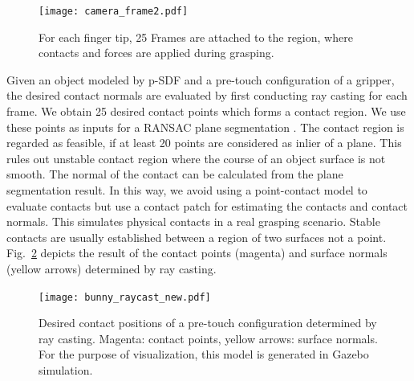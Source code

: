 \begin{figure}
\centering
\texttt{[image: camera\_frame2.pdf]}
\captionsetup{justification=raggedright}
\caption{For each finger tip, 25 Frames are attached to the region, where contacts and forces are applied during grasping.}
\label{fig:simulated_sensor}       %
\end{figure}   

Given an object modeled by p-SDF and a pre-touch configuration of a gripper, the desired contact normals are evaluated by first conducting ray casting for each frame. We obtain 25 desired contact points which forms a contact region.  We use these points as inputs for a RANSAC plane segmentation \cite{Zuliani2008}. The contact region is regarded as feasible, if at least 20 points are considered as inlier of a plane. This rules out unstable contact region where the course of an object surface is not smooth. The normal of the contact can be calculated from the plane segmentation result. In this way, we avoid using a point-contact model to evaluate contacts but use a contact patch for estimating the contacts and contact normals. This simulates physical contacts in a real grasping scenario. Stable contacts are usually established between a region of two surfaces not a point.  Fig.~\ref{fig:bunny_raycast} depicts the result of the contact points (magenta) and surface normals (yellow arrows) determined by ray casting.

\begin{figure}
\centering
\texttt{[image: bunny\_raycast\_new.pdf]}
\captionsetup{justification=raggedright}
\caption{Desired contact positions of a pre-touch configuration determined by ray casting. Magenta: contact points, yellow arrows: surface normals. For  the purpose of visualization, this model is generated in Gazebo simulation.}
\label{fig:bunny_raycast}       %
\end{figure} 


